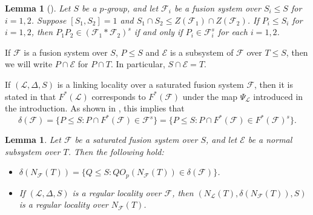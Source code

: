 \documentclass[reqno,11pt]{amsart}
\numberwithin{equation}{section}
\newtheorem{lemma}[theorem]{Lemma}
\theoremstyle{definition}
\newcommand{\F}{\mathcal{F}}
\newcommand{\E}{\mathcal{E}}
\renewcommand{\L}{\mathcal{L}}
\begin{document}
\begin{lemma}[{\cite[Lemma~2.14(g)]{Henke:Regular}}]\label{E:F1F2}
Let $S$ be a $p$-group, and let $\F_i$ be a fusion system over $S_i\leq S$ for $i=1,2$. Suppose $[S_1,S_2]=1$ and $S_1\cap S_2\leq Z(\F_1)\cap Z(\F_2)$. If $P_i\leq S_i$ for $i=1,2$, then $P_1P_2\in(\F_1*\F_2)^s$ if and only if $P_i\in\F_i^s$ for each $i=1,2$.
\end{lemma}

If $\F$ is a fusion system over $S$, $P\leq S$ and $\E$ is a subsystem of $\F$ over $T\leq S$, then we will write $P\cap \E$ for $P\cap T$. In particular, $S\cap \E=T$.

\smallskip

If $(\L,\Delta,S)$ is a linking locality over a saturated fusion system $\F$, then it is stated in \cite[Theorem~E(d)]{Chermak/Henke} that $F^*(\L)$ corresponds to $F^*(\F)$ under the map $\Psi_\L$ introduced in the introduction. As shown in \cite[Lemma~7.21]{Chermak/Henke}, this implies that
\begin{equation}\label{E:deltaFFusion}
\delta(\F)=\{P\leq S\colon P\cap F^*(\F)\in\F^s\}=\{P\leq S\colon P\cap F^*(\F)\in F^*(\F)^s\}.
\end{equation}



\begin{lemma}\label{L:NLTRegular}
Let $\F$ be a saturated fusion system over $S$, and let $\E$ be a normal subsystem over $T$. Then the following hold:
\begin{itemize}
 \item [(a)] $\delta(N_\F(T))=\{Q\leq S\colon QO_p(N_\F(T))\in\delta(\F)\}$.
 \item [(b)] If $(\L,\Delta,S)$ is a regular locality over $\F$, then $(N_\L(T),\delta(N_\F(T)),S)$ is a regular locality over $N_\F(T)$.
\end{itemize}
\end{lemma}
\end{document}
